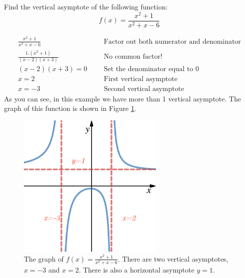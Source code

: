 \begin{exa}
        Find the vertical asymptote of the following function:
        \begin{equation*}
                    f(x) = \frac{x^2+1}{x^2+x-6}
        \end{equation*}
\end{exa}
\begin{align*}
    \frac{x^2+1}{x^2+x-6}&      &   &\text{Factor out both numerator and denominator}\\
    \frac{1.(x^2+1)}{(x-2)(x+3)}&   &   &\text{No common factor!}\\
    (x-2)(x+3)=0&       &       &\text{Set the denominator equal to 0}\\
    x=2&    &   &\text{First vertical asymptote}\\
    x=-3&   &   &\text{Second vertical asymptote}
\end{align*}
As you can see, in this example we have more than 1 vertical asymptote. The graph of this function is shown in Figure \ref{fig:ex_3}.
\begin{figure}[ht]
    \centering
    \includegraphics[width=7cm]{pics/ex3.png}
    \caption{The graph of $f(x)=\frac{x^2+1}{x^2+x-6}$. There are two vertical asymptotes, $x=-3$ and $x=2$. There is also a horizontal asymptote $y=1$.}
    \label{fig:ex_3}
\end{figure}
